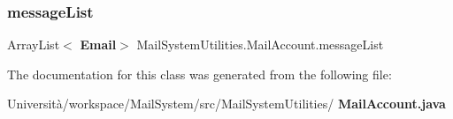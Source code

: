 \mbox{\label{class_mail_system_utilities_1_1_mail_account_a432e95f056da8f4320eea72abaa50fc8}} 
\subsubsection{message\+List}
{\footnotesize\ttfamily Array\+List$<$\textbf{ Email}$>$ Mail\+System\+Utilities.\+Mail\+Account.\+message\+List\hspace{0.3cm}{\ttfamily [package]}}



The documentation for this class was generated from the following file\+:\begin{DoxyCompactItemize}
\item 
Università/workspace/\+Mail\+System/src/\+Mail\+System\+Utilities/\textbf{ Mail\+Account.\+java}\end{DoxyCompactItemize}

